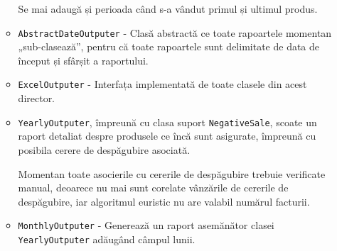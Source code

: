 \begin{itemize}
\begin{itemize}
			Se mai adaugă și perioada când s-a vândut primul și ultimul produs.
			\item \verb|AbstractDateOutputer| - Clasă abstractă ce toate rapoartele momentan \\„sub-clasează”, pentru că toate rapoartele sunt delimitate de data de început și sfârșit a raportului.
			\item \verb|ExcelOutputer| - Interfața implementată de toate clasele din acest director.
			\item \verb|YearlyOutputer|, împreună cu clasa suport \verb|NegativeSale|, scoate un raport detaliat despre produsele ce încă sunt asigurate, împreună cu posibila cerere de despăgubire asociată.

			Momentan toate asocierile cu cererile de despăgubire trebuie verificate manual, deoarece nu mai sunt corelate vânzările de cererile de despăgubire, iar algoritmul euristic nu are valabil numărul facturii.
			\item \verb|MonthlyOutputer| - Generează un raport asemănător clasei \verb|YearlyOutputer| adăugând câmpul lunii.
		\end{itemize}
	\end{itemize}
